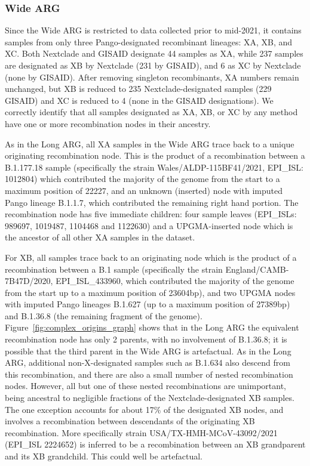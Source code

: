 \documentclass{article}
\begin{document}
\subsubsection{Wide ARG}
\label{sec-pango_x_wide_arg}
Since the Wide ARG is restricted to data collected prior
to mid-2021, it contains samples from only three Pango-designated recombinant
lineages: XA, XB, and XC. Both Nextclade and GISAID designate 44
samples as XA, while 237 samples are designated
as XB by Nextclade (231 by GISAID), and 6 as XC by Nextclade (none by GISAID).
After removing singleton recombinants, XA numbers remain unchanged, but XB is
reduced to 235 Nextclade-designated samples (229 GISAID) and XC is reduced to 4
(none in the GISAID designations). We correctly identify that all samples
designated as XA, XB, or XC by any method have one or more recombination nodes
in their ancestry.

As in the Long ARG, all XA samples in the Wide ARG trace back to a
unique originating recombination node. This is the product of a recombination
between a B.1.177.18 sample (specifically the strain Wales/ALDP-115BF41/2021,
EPI\_ISL: 1012804) which contributed the majority of the genome from the start
to a maximum position of 22227, and an unknown (inserted) node with imputed
Pango lineage B.1.1.7, which contributed the remaining right hand portion. The
recombination node has five immediate children: four sample leaves (EPI\_ISLs:
989697, 1019487, 1104468 and 1122630) and a UPGMA-inserted node which is the
ancestor of all other XA samples in the dataset.

For XB, all samples trace back to an originating node which is the product of a
recombination between a B.1 sample (specifically the strain
England/CAMB-7B47D/2020, EPI\_ISL\_433960, which contributed the majority of
the genome from the start up to a maximum position of 23604bp), and two
UPGMA nodes with imputed Pango lineages B.1.627 (up to a maximum position of
27389bp) and B.1.36.8 (the remaining fragment of the genome). Figure~\ref{fig:complex_origins_graph}
shows that in the Long ARG the equivalent recombination node has only 2 parents,
with no involvement of  B.1.36.8; it is possible that the third parent in
the Wide ARG is artefactual. As in the Long ARG, additional
non-X-designated samples such as B.1.634 also descend from this recombination,
and there are also a small number of nested recombination nodes. However, all but
one of these nested recombinations are unimportant, being ancestral to negligible fractions
of the Nextclade-designated XB samples. The one exception accounts for about 17\% of the
designated XB nodes, and involves a recombination between descendants of the
originating XB recombination. More specifically strain
USA/TX-HMH-MCoV-43092/2021 (EPI\_ISL 2224652) is inferred to be a recombination
between an XB grandparent and its XB grandchild. This could well be
artefactual.
\end{document}
